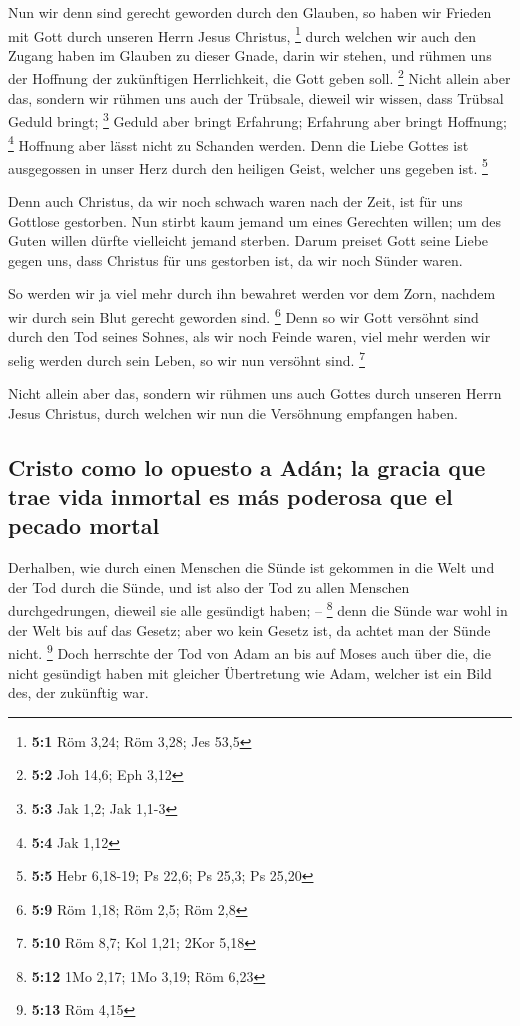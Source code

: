 Nun wir denn sind gerecht geworden durch den Glauben, so
haben wir Frieden mit Gott durch unseren Herrn Jesus Christus,
\footnote{\textbf{5:1} Röm 3,24; Röm 3,28; Jes 53,5} 
durch welchen wir auch den Zugang haben im Glauben zu dieser Gnade,
darin wir stehen, und rühmen uns der Hoffnung der zukünftigen
Herrlichkeit, die Gott geben soll. \footnote{\textbf{5:2} Joh 14,6; Eph
  3,12}  Nicht allein aber das, sondern wir rühmen uns
auch der Trübsale, dieweil wir wissen, dass Trübsal Geduld bringt;
\footnote{\textbf{5:3} Jak 1,2; Jak 1,1-3}  Geduld aber
bringt Erfahrung; Erfahrung aber bringt Hoffnung; \footnote{\textbf{5:4}
  Jak 1,12}  Hoffnung aber lässt nicht zu Schanden werden.
Denn die Liebe Gottes ist ausgegossen in unser Herz durch den heiligen
Geist, welcher uns gegeben ist. \footnote{\textbf{5:5} Hebr 6,18-19; Ps
  22,6; Ps 25,3; Ps 25,20}

 Denn auch Christus, da wir noch schwach waren nach der
Zeit, ist für uns Gottlose gestorben.  Nun stirbt kaum
jemand um eines Gerechten willen; um des Guten willen dürfte vielleicht
jemand sterben.  Darum preiset Gott seine Liebe gegen uns,
dass Christus für uns gestorben ist, da wir noch Sünder waren.

 So werden wir ja viel mehr durch ihn bewahret werden vor
dem Zorn, nachdem wir durch sein Blut gerecht geworden sind. \footnote{\textbf{5:9}
  Röm 1,18; Röm 2,5; Röm 2,8}  Denn so wir Gott versöhnt
sind durch den Tod seines Sohnes, als wir noch Feinde waren, viel mehr
werden wir selig werden durch sein Leben, so wir nun versöhnt sind.
\footnote{\textbf{5:10} Röm 8,7; Kol 1,21; 2Kor 5,18}

 Nicht allein aber das, sondern wir rühmen uns auch
Gottes durch unseren Herrn Jesus Christus, durch welchen wir nun die
Versöhnung empfangen haben.

\hypertarget{cristo-como-lo-opuesto-a-aduxe1n-la-gracia-que-trae-vida-inmortal-es-muxe1s-poderosa-que-el-pecado-mortal}{%
\subsection{Cristo como lo opuesto a Adán; la gracia que trae vida
inmortal es más poderosa que el pecado
mortal}\label{cristo-como-lo-opuesto-a-aduxe1n-la-gracia-que-trae-vida-inmortal-es-muxe1s-poderosa-que-el-pecado-mortal}}

 Derhalben, wie durch einen Menschen die Sünde ist
gekommen in die Welt und der Tod durch die Sünde, und ist also der Tod
zu allen Menschen durchgedrungen, dieweil sie alle gesündigt haben; --
\footnote{\textbf{5:12} 1Mo 2,17; 1Mo 3,19; Röm 6,23} 
denn die Sünde war wohl in der Welt bis auf das Gesetz; aber wo kein
Gesetz ist, da achtet man der Sünde nicht. \footnote{\textbf{5:13} Röm
  4,15}  Doch herrschte der Tod von Adam an bis auf Moses
auch über die, die nicht gesündigt haben mit gleicher Übertretung wie
Adam, welcher ist ein Bild des, der zukünftig war.

